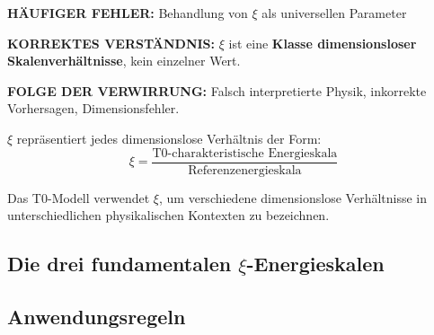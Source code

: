 \documentclass[12pt,a4paper]{article}
\begin{document}
	\begin{tcolorbox}[colback=red!10!white,colframe=red!75!black,title=KRITISCHE WARNUNG: $\xi$-Parameter-Verwirrung]
		\textbf{HÄUFIGER FEHLER:} Behandlung von $\xi$ als universellen Parameter
		
		\textbf{KORREKTES VERSTÄNDNIS:} $\xi$ ist eine \textbf{Klasse dimensionsloser Skalenverhältnisse}, kein einzelner Wert.
		
		\textbf{FOLGE DER VERWIRRUNG:} Falsch interpretierte Physik, inkorrekte Vorhersagen, Dimensionsfehler.
		
		$\xi$ repräsentiert jedes dimensionslose Verhältnis der Form:
		\begin{equation}
			\xi = \frac{\text{T0-charakteristische Energieskala}}{\text{Referenzenergieskala}}
		\end{equation}
		
		Das T0-Modell verwendet $\xi$, um verschiedene dimensionslose Verhältnisse in unterschiedlichen physikalischen Kontexten zu bezeichnen.
	\end{tcolorbox}
	
	\subsection{Die drei fundamentalen $\xi$-Energieskalen}
	
	\begin{table}[H]
		\centering
		\caption{Die drei fundamentalen $\xi$-Parametertypen im T0-Modell}
		\label{tab:xi_hierarchy}
	\end{table}
	
	\subsection{Anwendungsregeln}
	
\end{document}
